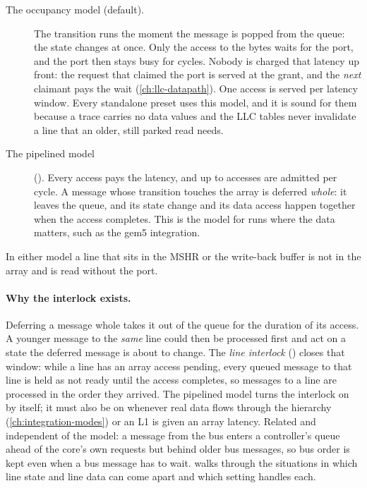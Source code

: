 \begin{description}
\item[The occupancy model (default).] The transition runs the moment the message is popped from
  the queue: the state changes at once. Only the access to the bytes waits for the port, and the
  port then stays busy for  cycles. Nobody is
  charged that latency up front: the request that claimed the port is served at the grant, and
  the \emph{next} claimant pays the wait (\cref{ch:llc-datapath}). One access is served per
  latency window. Every standalone preset uses this model, and it is sound for them because a
  trace carries no data values and the LLC tables never invalidate a line that an older, still
  parked read needs.
\item[The pipelined model] (). Every
  access pays the latency, and up to  accesses are
  admitted per cycle. A message whose transition touches the array is deferred \emph{whole}: it
  leaves the queue, and its state change and its data access happen together when the access
  completes. This is the model for runs where the data matters, such as the gem5 integration.
\end{description}

In either model a line that sits in the MSHR or the write-back buffer is not in the array and is
read without the port.

\paragraph{Why the interlock exists.} Deferring a message whole takes it out of the queue for the
duration of its access. A younger message to the \emph{same} line could then be processed first
and act on a state the deferred message is about to change. The \emph{line interlock}
() closes that window: while a line has an array access pending,
every queued message to that line is held as not ready until the access completes, so messages to
a line are processed in the order they arrived. The pipelined model turns the interlock on by
itself; it must also be on whenever real data flows through the hierarchy
(\cref{ch:integration-modes}) or an L1 is given an array latency. Related and independent of the
model: a message from the bus enters a controller's queue ahead of the core's own requests but
behind older bus messages, so bus order is kept even when a bus message has to wait.
 walks through the situations in which line state and line data can
come apart and which setting handles each.

